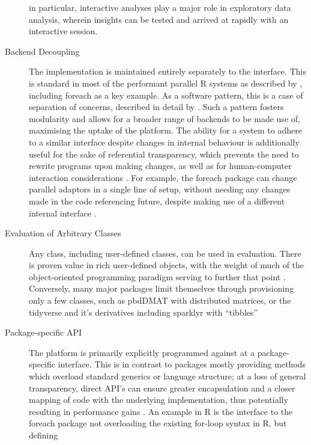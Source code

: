 \begin{description}
    in particular, interactive analyses play a major role in exploratory
    data analysis, wherein insights can be tested and arrived at rapidly
    with an interactive session.
  \item[Backend Decoupling]
    The implementation is maintained entirely separately to the interface.
    This is standard in most of the performant parallel R systems as
    described by \cite{eddelbuettel2019parallel}, including foreach as a key
    example\cite{microsoft20}. As a software pattern, this is a case of
    separation of concerns, described in detail by \cite{dijkstra1982role}.
    Such a pattern fosters modularity and allows for a broader range of
    backends to be made use of, maximising the uptake of the platform. The
    ability for a system to adhere to a similar interface despite changes in
    internal behaviour is additionally useful for the sake of referential
    transparency, which prevents the need to rewrite programs upon making
    changes, as well as for human-computer interaction considerations
    \cite{sondergaard1990Rtda}\cite{norman2013design}. For example, the foreach
    package can change parallel adaptors in a single line of setup, without
    needing any changes made in the code referencing future, despite making
    use of a different internal interface \cite{weston19:_using}.
  \item[Evaluation of Arbitrary Classes]
    Any class, including user-defined classes, can be used in evaluation.
    There is proven value in rich user-defined objects, with the weight of
    much of the object-oriented programming paradigm serving to further that
    point \cite{dahl2004simula}. Conversely, many major packages limit
    themselves through provisioning only a few classes, such as pbdDMAT with
    distributed matrices, or the tidyverse and it's derivatives including
    sparklyr with ``tibbles'' \cite{pbdDMATpackage}\cite{wickham2019welcome}
  \item[Package-specific API]
    The platform is primarily explicitly programmed against at a
    package-specific interface. This is in contrast to packages mostly
    providing methods which overload standard generics or language
    structure; at a loss of general transparency, direct API's can ensure
    greater encapsulation and a closer mapping of code with the underlying
    implementation, thus potentially resulting in performance gains
    \cite{bierhoff2009api}. An example in R is the interface to the foreach
    package not overloading the existing for-loop syntax in R, but defining

\end{description}
